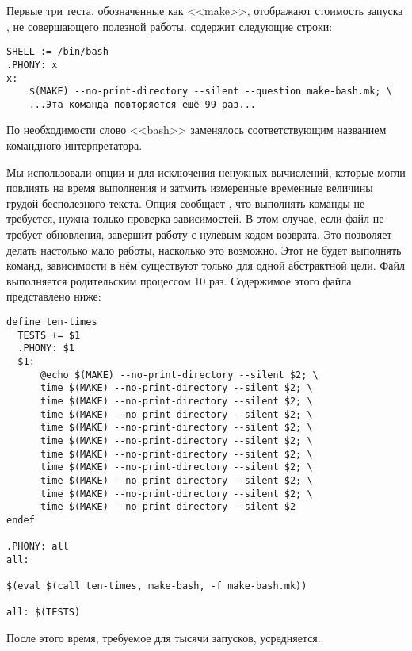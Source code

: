 Первые три теста, обозначенные как <<make>>, отображают стоимость
запуска \GNUmake{}, не совершающего полезной работы. \makefile{}
содержит следующие строки:

{\footnotesize
\begin{verbatim}
SHELL := /bin/bash
.PHONY: x
x:
    $(MAKE) --no-print-directory --silent --question make-bash.mk; \
    ...Эта команда повторяется ещё 99 раз...
\end{verbatim}
}

По необходимости слово <<bash>> заменялось соответствующим названием
командного интерпретатора.

Мы использовали опции  и
\command{-{}-{}silent} для исключения ненужных вычислений, которые
могли повлиять на время выполнения и затмить измеренные временные
величины грудой бесполезного текста. Опция 
сообщает \GNUmake{}, что выполнять команды не требуется, нужна только
проверка зависимостей. В этом случае, если файл не требует обновления,
\GNUmake{} завершит работу с нулевым кодом возврата. Это позволяет
\GNUmake{} делать настолько мало работы, насколько это возможно. Этот
\makefile{} не будет выполнять команд, зависимости в нём существуют
только для одной абстрактной цели. Файл \filename{make-bash.mk}
выполняется родительским процессом \GNUmake{} 10 раз. Содержимое этого
файла представлено ниже:

{\footnotesize
\begin{verbatim}
define ten-times
  TESTS += $1
  .PHONY: $1
  $1:
      @echo $(MAKE) --no-print-directory --silent $2; \
      time $(MAKE) --no-print-directory --silent $2; \
      time $(MAKE) --no-print-directory --silent $2; \
      time $(MAKE) --no-print-directory --silent $2; \
      time $(MAKE) --no-print-directory --silent $2; \
      time $(MAKE) --no-print-directory --silent $2; \
      time $(MAKE) --no-print-directory --silent $2; \
      time $(MAKE) --no-print-directory --silent $2; \
      time $(MAKE) --no-print-directory --silent $2; \
      time $(MAKE) --no-print-directory --silent $2; \
      time $(MAKE) --no-print-directory --silent $2
endef

.PHONY: all
all:

$(eval $(call ten-times, make-bash, -f make-bash.mk))

all: $(TESTS)
\end{verbatim}
}

После этого время, требуемое для тысячи запусков, усредняется.


